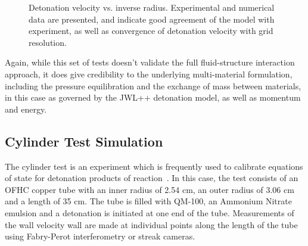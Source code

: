 \begin{figure}
  \center
  \caption{Detonation velocity vs. inverse radius.  Experimental and numerical 
          data are presented, and indicate good agreement of the model 
          with experiment, as well as convergence of detonation velocity 
          with grid resolution.}
  \label{figRSSE}
\end{figure}

Again, while this set of tests doesn't validate the full fluid-structure 
interaction approach, it does give credibility to the underlying 
multi-material formulation, including the pressure equilibration and the
exchange of mass between materials, in this case as governed by the 
JWL++ detonation model, as well as momentum and energy.

\subsection{Cylinder Test Simulation}

The cylinder test is an experiment which is frequently used to calibrate 
equations of state for detonation products of 
reaction~\cite{Souers2001CylinderTest}.  In this case, the test consists of an OFHC
copper tube with an inner radius of 2.54 cm, an outer radius of 3.06 cm and 
a length of 35 cm.  The tube is filled with QM-100, an Ammonium Nitrate 
emulsion and a detonation is initiated at one end of the tube.  Measurements
of the wall velocity wall are made at individual points along the length of 
the tube using Fabry-Perot interferometry or streak cameras.

